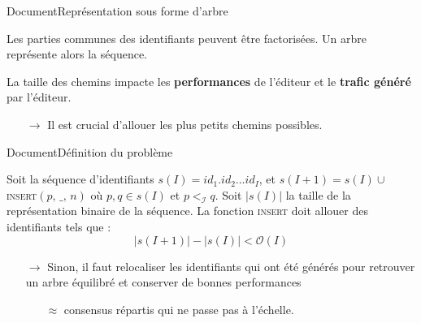 \begin{frame}{Document}{Représentation sous forme d'arbre}

  \begin{center}
    
  \end{center}
  
  \vspace{0.15cm}
  
  \begin{minipage}{0.45\textwidth}
    Les parties communes des identifiants peuvent être factorisées. Un arbre
    représente alors la séquence.

    \vspace{0.2cm}

    La taille des chemins impacte les \textbf{performances} de l'éditeur et le
    \textbf{trafic généré} par l'éditeur.
    \begin{itemize}
    \item [$\rightarrow$] Il est crucial d'allouer les plus petits chemins
      possibles.
    \end{itemize}
  \end{minipage}
  \hfill
  \begin{minipage}{0.45\textwidth}
    \begin{center}
      
    \end{center}
  \end{minipage}

\end{frame}



\begin{frame}{Document}{Définition du problème}

  \begin{problem}
    Soit la séquence d'identifiants $s(I)= id_1.id_2\ldots id_I$, et
    $s(I+1) = s(I) \cup $\textsc{insert}$(p,\, \_,\, n)$ où $p,q \in s(I)$ et
    $p<_\mathcal{I}q$. Soit $|s(I)|$ la taille de la représentation binaire de la
    séquence. La fonction \textsc{insert} doit allouer des identifiants tels que :
    \begin{equation}
      |s(I+1)| - |s(I)| < \mathcal{O}(I)
    \end{equation}
  \end{problem}
  
  \vspace{0.5cm}

  \begin{itemize}
  \item [$\rightarrow$] Sinon, il faut relocaliser les identifiants qui ont été
    générés pour retrouver un arbre équilibré et conserver de bonnes performances
    \begin{itemize}
    \item [$\approx$] consensus répartis qui ne passe pas à l'échelle.
    \end{itemize}
  \end{itemize}

\end{frame}


